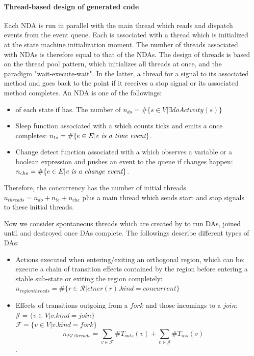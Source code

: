 \paragraph{Thread-based design of generated code}
Each NDA is run in parallel with the main thread which reads and dispatch events from the event queue. 
Each is associated with a thread which is initialized at the state machine initialization moment. 
The number of threads associated with NDAs is therefore equal to that of the NDAs.
The design of threads is based on the thread pool pattern, which initializes all threads at once, and the paradigm "wait-execute-wait". 
In the latter, a thread  for a signal to  its associated method and goes back to the  point if it receives a stop signal or its associated method completes. 
An NDA is one of the followings:
\begin{itemize}
	\item {} of each state if has. The number of  $n_{do} = \#\{s \in V|\exists doActivity(s)\}$
	
	\item Sleep function associated with a  which counts ticks and emits a  once completes: $n_{te} = \#\{e \in E|\textit{e is a time event}\}$.
	
	\item Change detect function associated with a  which observes a variable or a boolean expression and pushes an event to the queue if changes happen: $n_{che} = \#\{e \in E|\textit{e is a change event}\}$.
\end{itemize} 

Therefore, the concurrency has the number of initial threads $n_{threads} = n_{do} + n_{te} + n_{che}$ plus a main thread which sends start and stop signals to these initial threads. 

Now we consider spontaneous threads which are created by  to run DAs, joined until and destroyed once DAs complete. The followings describe different types of DAs:

\begin{itemize}
	\item Actions executed when entering/exiting an orthogonal region, which can be: execute a chain of transition effects contained by the region before entering a stable sub-state or exiting the region completely: $n_{region threads} = \#\{r \in \mathcal{R}|ctner(r).kind=concurrent\}$
	
	\item Effects of transitions outgoing from a $fork$ and those incomings to a $join$: \\
	$\mathcal{J} = \{v \in V|v.kind=join\}$ \\
	$\mathcal{F} = \{v \in V|v.kind=fork\}$ \\
	$$n_{FJ\_threads} = \sum_{v \in \mathcal{F}} {\#T_{outs}(v)} + \sum_{v \in \mathcal{J}} {\#T_{ins}(v)}$$.
\end{itemize}

